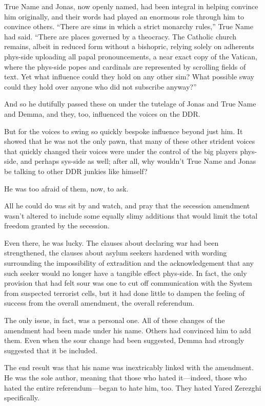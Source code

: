 True Name and Jonas, now openly named, had been integral in helping convince him originally, and their words had played an enormous role through him to convince others. ``There are sims in which a strict monarchy rules,'' True Name had said. ``There are places governed by a theocracy. The Catholic church remains, albeit in reduced form without a bishopric, relying solely on adherents phys-side uploading all papal pronouncements, a near exact copy of the Vatican, where the phys-side popes and cardinals are represented by scrolling fields of text. Yet what influence could they hold on any other sim? What possible sway could they hold over anyone who did not subscribe anyway?''

And so he dutifully passed these on under the tutelage of Jonas and True Name and Demma, and they, too, influenced the voices on the DDR.

But for the voices to swing so quickly bespoke influence beyond just him. It showed that he was not the only pawn, that many of these other strident voices that quickly changed their voices were under the control of the big players phys-side, and perhaps sys-side as well; after all, why wouldn't True Name and Jonas be talking to other DDR junkies like himself?

He was too afraid of them, now, to ask.

All he could do was sit by and watch, and pray that the secession amendment wasn't altered to include some equally slimy additions that would limit the total freedom granted by the secession.

Even there, he was lucky. The clauses about declaring war had been strengthened, the clauses about asylum seekers hardened with wording surrounding the impossibility of extradition and the acknowledgement that any such seeker would no longer have a tangible effect phys-side. In fact, the only provision that had felt sour was one to cut off communication with the System from suspected terrorist cells, but it had done little to dampen the feeling of success from the overall amendment, the overall referendum.

The only issue, in fact, was a personal one. All of these changes of the amendment had been made under his name. Others had convinced him to add them. Even when the sour change had been suggested, Demma had strongly suggested that it be included.

The end result was that his name was inextricably linked with the amendment. He was the sole author, meaning that those who hated it---indeed, those who hated the entire referendum---began to hate him, too. They hated Yared Zerezghi specifically.

